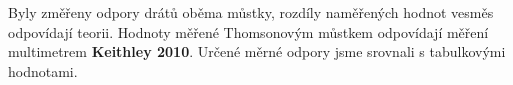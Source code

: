 \documentclass[0-protokol.tex]{subfiles}
\begin{document}
Byly změřeny odpory drátů oběma můstky, rozdíly naměřených hodnot vesměs odpovídají teorii. Hodnoty měřené Thomsonovým můstkem odpovídají měření multimetrem \textbf{Keithley 2010}. Určené měrné odpory jsme srovnali s tabulkovými hodnotami.
\end{document}
